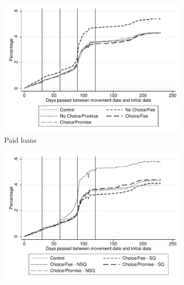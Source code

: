 \documentclass[11pt]{article}
\begin{document}
\begin{figure}[H]
    \caption{Evolution of payment}
    \label{Evolution payment}
    \begin{center}
    \begin{subfigure}{0.49\textwidth}
        \caption{Paid loans}
        \centering
        \includegraphics[width=\textwidth]{Figuras/desempeno_evol.pdf}
    \end{subfigure}
     \begin{subfigure}{0.49\textwidth}
      \caption*{}
        \centering
        \includegraphics[width=\textwidth]{Figuras/desempeno_evol_choice.pdf}
    \end{subfigure}
    

\end{center}
\end{figure}
\end{document}
